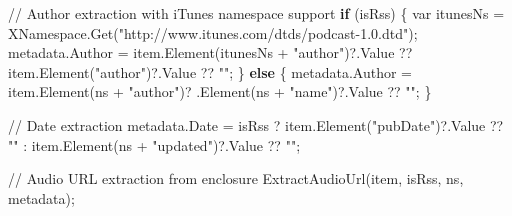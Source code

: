 \documentclass[
  letterpaper,
  DIV=11,
  numbers=noendperiod]{scrartcl}
\newenvironment{Shaded}{\begin{snugshade}}{\end{snugshade}}
\newcommand{\CommentTok}[1]{\textcolor[rgb]{0.37,0.37,0.37}{#1}}
\newcommand{\DataTypeTok}[1]{\textcolor[rgb]{0.68,0.00,0.00}{#1}}
\newcommand{\FunctionTok}[1]{\textcolor[rgb]{0.28,0.35,0.67}{#1}}
\newcommand{\KeywordTok}[1]{\textcolor[rgb]{0.00,0.23,0.31}{\textbf{#1}}}
\newcommand{\NormalTok}[1]{\textcolor[rgb]{0.00,0.23,0.31}{#1}}
\newcommand{\OperatorTok}[1]{\textcolor[rgb]{0.37,0.37,0.37}{#1}}
\newcommand{\StringTok}[1]{\textcolor[rgb]{0.13,0.47,0.30}{#1}}
\begin{document}
\begin{Shaded}
\begin{Highlighting}[]
        \CommentTok{// Author extraction with iTunes namespace support}
        \KeywordTok{if} \OperatorTok{(}\NormalTok{isRss}\OperatorTok{)}
        \OperatorTok{\{}
            \DataTypeTok{var}\NormalTok{ itunesNs }\OperatorTok{=}\NormalTok{ XNamespace}\OperatorTok{.}\FunctionTok{Get}\OperatorTok{(}\StringTok{"http://www.itunes.com/dtds/podcast{-}1.0.dtd"}\OperatorTok{);}
\NormalTok{            metadata}\OperatorTok{.}\FunctionTok{Author} \OperatorTok{=}\NormalTok{ item}\OperatorTok{.}\FunctionTok{Element}\OperatorTok{(}\NormalTok{itunesNs }\OperatorTok{+} \StringTok{"author"}\OperatorTok{)?.}\FunctionTok{Value}
                           \OperatorTok{??}\NormalTok{ item}\OperatorTok{.}\FunctionTok{Element}\OperatorTok{(}\StringTok{"author"}\OperatorTok{)?.}\FunctionTok{Value} \OperatorTok{??} \StringTok{""}\OperatorTok{;}
        \OperatorTok{\}}
        \KeywordTok{else}
        \OperatorTok{\{}
\NormalTok{            metadata}\OperatorTok{.}\FunctionTok{Author} \OperatorTok{=}\NormalTok{ item}\OperatorTok{.}\FunctionTok{Element}\OperatorTok{(}\NormalTok{ns }\OperatorTok{+} \StringTok{"author"}\OperatorTok{)?}
                                  \OperatorTok{.}\FunctionTok{Element}\OperatorTok{(}\NormalTok{ns }\OperatorTok{+} \StringTok{"name"}\OperatorTok{)?.}\FunctionTok{Value} \OperatorTok{??} \StringTok{""}\OperatorTok{;}
        \OperatorTok{\}}

        \CommentTok{// Date extraction}
\NormalTok{        metadata}\OperatorTok{.}\FunctionTok{Date} \OperatorTok{=}\NormalTok{ isRss}
            \OperatorTok{?}\NormalTok{ item}\OperatorTok{.}\FunctionTok{Element}\OperatorTok{(}\StringTok{"pubDate"}\OperatorTok{)?.}\FunctionTok{Value} \OperatorTok{??} \StringTok{""}
            \OperatorTok{:}\NormalTok{ item}\OperatorTok{.}\FunctionTok{Element}\OperatorTok{(}\NormalTok{ns }\OperatorTok{+} \StringTok{"updated"}\OperatorTok{)?.}\FunctionTok{Value} \OperatorTok{??} \StringTok{""}\OperatorTok{;}

        \CommentTok{// Audio URL extraction from enclosure}
        \FunctionTok{ExtractAudioUrl}\OperatorTok{(}\NormalTok{item}\OperatorTok{,}\NormalTok{ isRss}\OperatorTok{,}\NormalTok{ ns}\OperatorTok{,}\NormalTok{ metadata}\OperatorTok{);}


\end{Highlighting}
\end{Shaded}
\end{document}
